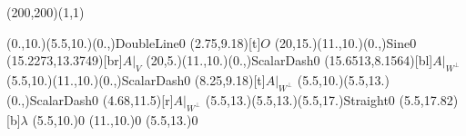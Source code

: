 \unitlength=1bp%

\begin{feynartspicture}(200,200)(1,1)

\FADiagram{}
\FAProp(0.,10.)(5.5,10.)(0.,){DoubleLine}{0}
\FALabel(2.75,9.18)[t]{$O$}
\FAProp(20,15.)(11.,10.)(0.,){Sine}{0}
\FALabel(15.2273,13.3749)[br]{$A|_V$}
\FAProp(20,5.)(11.,10.)(0.,){ScalarDash}{0}
\FALabel(15.6513,8.1564)[bl]{$A|_{W^\perp}$}
\FAProp(5.5,10.)(11.,10.)(0.,){ScalarDash}{0}
\FALabel(8.25,9.18)[t]{$A|_{W^\perp}$}
\FAProp(5.5,10.)(5.5,13.)(0.,){ScalarDash}{0}
\FALabel(4.68,11.5)[r]{$A|_{W^\perp}$}
\FAProp(5.5,13.)(5.5,13.)(5.5,17.){Straight}{0}
\FALabel(5.5,17.82)[b]{$\lambda$}
\FAVert(5.5,10.){0}
\FAVert(11.,10.){0}
\FAVert(5.5,13.){0}
\end{feynartspicture}


